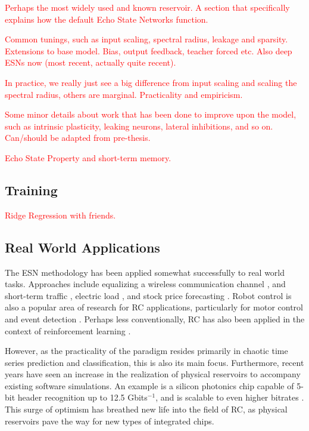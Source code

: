 \textcolor{red}{
  Perhaps the most widely used and known reservoir. A section that specifically
explains how the default Echo State Networks function.
}

\textcolor{red}{
  Common tunings, such as input scaling, spectral radius, leakage and
sparsity. Extensions to base model. Bias, output feedback, teacher forced
etc. Also deep ESNs now (most recent, actually quite recent).
}

\textcolor{red}{
  In practice, we really just see a big difference from input scaling and
scaling the spectral radius, others are marginal. Practicality and empiricism.
}

\textcolor{red}{
  Some minor details about work that has been done to improve upon the model,
such as intrinsic plasticity, leaking neurons, lateral inhibitions, and so
on. Can/should be adapted from pre-thesis.
}

\textcolor{red}{
  Echo State Property and short-term memory.
}

\subsection{Training}

\textcolor{red}{
  Ridge Regression with friends.
}

\subsection{Real World Applications}

The ESN methodology has been applied somewhat successfully to real world
tasks. Approaches include equalizing a wireless communication channel
\cite{jaeger_harnessing_2004}, and short-term traffic \cite{an_short-term_2011},
electric load \cite{song_hourly_2011}, and stock price forecasting
\cite{lin_short-term_2009}. Robot control is also a popular area of research for
RC applications, particularly for motor control and event detection
\cite{aislan_antonelo_learning_2015, harding_evolution_2005,
hutchison_movement_2004}. Perhaps less conventionally, RC has also been applied
in the context of reinforcement learning \cite{bush_modeling_2005}.

However, as the practicality of the paradigm resides primarily in chaotic time
series prediction and classification, this is also its main focus. Furthermore,
recent years have seen an increase in the realization of physical reservoirs to
accompany existing software simulations. An example is a silicon photonics chip
capable of 5-bit header recognition up to 12.5 Gbits$^{-1}$, and is scalable to
even higher bitrates \cite{vandoorne_experimental_2014}. This surge of optimism
has breathed new life into the field of RC, as physical reservoirs pave the way
for new types of integrated chips.

